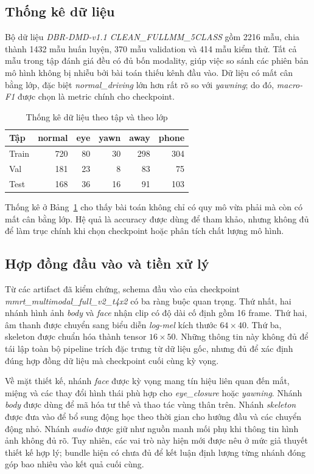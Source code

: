 \documentclass[conference,a4paper]{IEEEtran}
\begin{document}
\subsection{Thống kê dữ liệu}
Bộ dữ liệu \textit{DBR-DMD-v1.1 CLEAN\_FULLMM\_5CLASS} gồm 2216 mẫu, chia thành 1432 mẫu huấn luyện, 370 mẫu validation và 414 mẫu kiểm thử. Tất cả mẫu trong tập đánh giá đều có đủ bốn modality, giúp việc so sánh các phiên bản mô hình không bị nhiễu bởi bài toán thiếu kênh đầu vào. Dữ liệu có mất cân bằng lớp, đặc biệt \textit{normal\_driving} lớn hơn rất rõ so với \textit{yawning}; do đó, \textit{macro-F1} được chọn là metric chính cho checkpoint.

\begin{table}[t]
\caption{Thống kê dữ liệu theo tập và theo lớp}
\label{tab:data-stats}
\centering
\small
\begin{tabular}{lrrrrr}
\toprule
Tập & normal & eye & yawn & away & phone \\
\midrule
Train & 720 & 80 & 30 & 298 & 304 \\
Val & 181 & 23 & 8 & 83 & 75 \\
Test & 168 & 36 & 16 & 91 & 103 \\
\bottomrule
\end{tabular}
\end{table}

Thống kê ở Bảng~\ref{tab:data-stats} cho thấy bài toán không chỉ có quy mô vừa phải mà còn có mất cân bằng lớp. Hệ quả là accuracy được dùng để tham khảo, nhưng không đủ để làm trục chính khi chọn checkpoint hoặc phân tích chất lượng mô hình.

\subsection{Hợp đồng đầu vào và tiền xử lý}
Từ các artifact đã kiểm chứng, schema đầu vào của checkpoint \textit{mmrt\_multimodal\_full\_v2\_t4x2} có ba ràng buộc quan trọng. Thứ nhất, hai nhánh hình ảnh \textit{body} và \textit{face} nhận clip có độ dài cố định gồm 16 frame. Thứ hai, âm thanh được chuyển sang biểu diễn \textit{log-mel} kích thước $64 \times 40$. Thứ ba, skeleton được chuẩn hóa thành tensor $16 \times 50$. Những thông tin này không đủ để tái lập toàn bộ pipeline trích đặc trưng từ dữ liệu gốc, nhưng đủ để xác định đúng hợp đồng dữ liệu mà checkpoint cuối cùng kỳ vọng.

Về mặt thiết kế, nhánh \textit{face} được kỳ vọng mang tín hiệu liên quan đến mắt, miệng và các thay đổi hình thái phù hợp cho \textit{eye\_closure} hoặc \textit{yawning}. Nhánh \textit{body} được dùng để mã hóa tư thế và thao tác vùng thân trên. Nhánh \textit{skeleton} được đưa vào để bổ sung động học theo thời gian cho hướng đầu và các chuyển động nhỏ. Nhánh \textit{audio} được giữ như nguồn manh mối phụ khi thông tin hình ảnh không đủ rõ. Tuy nhiên, các vai trò này hiện mới được nêu ở mức giả thuyết thiết kế hợp lý; bundle hiện có chưa đủ để kết luận định lượng từng nhánh đóng góp bao nhiêu vào kết quả cuối cùng.
\end{document}
